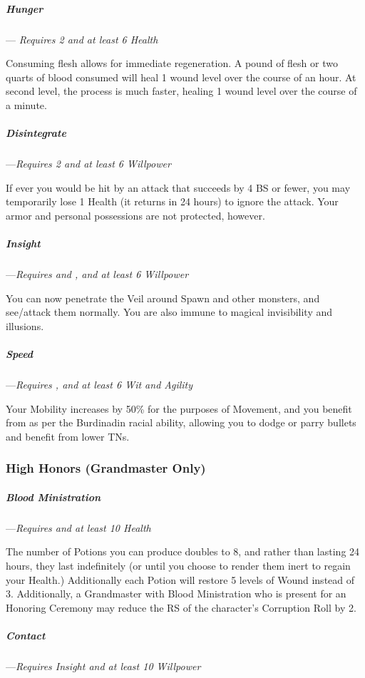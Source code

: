 \documentclass[oneside,11pt,english]{book}
\begin{document}
\subparagraph{Hunger}---\quad\label{honor:Hunger}
\emph{Requires  2 and at least 6 Health}

Consuming flesh allows for immediate regeneration. A pound of flesh or two quarts of blood consumed will heal 1 wound level over the 
course of an hour. At second level, the process is much faster, healing 1 wound level over the 
course of a minute.

\subparagraph{Disintegrate}\label{honor:Disintegrate}
---\quad \emph{Requires  2 and at least 6 Willpower}

If ever you would be hit by an attack that succeeds by 4 BS or fewer, you may temporarily lose 1 Health (it returns in 24 hours) 
to ignore the attack. Your armor and personal possessions are not protected, however. 

\subparagraph{Insight}\label{honor:Insight}
---\quad \emph{Requires  and , and at least 6 Willpower}

You can now penetrate the Veil 
around Spawn and other monsters, and see/attack them normally. You are also immune to 
magical invisibility and illusions. 

\subparagraph{Speed}\label{honor:Speed}
---\quad \emph{Requires , and at least 6 Wit and Agility}

Your Mobility increases by 50\% for the 
purposes of Movement, and you benefit from  as per the Burdinadin racial ability, 
allowing you to dodge or parry bullets and benefit from lower TNs. 

\subsubsection{High Honors (Grandmaster Only)}
\subparagraph{Blood Ministration}\label{honor:Blood Ministration}
---\quad \emph{Requires  and at least 10 Health}

The number of Potions you can produce doubles to 8, and rather than lasting 24 hours, they last indefinitely (or until you 
choose to render them inert to regain your Health.) Additionally each Potion will restore 5 levels of Wound instead of 3.
Additionally, a Grandmaster with Blood Ministration who is present for an 
Honoring Ceremony may reduce the RS of the character’s Corruption Roll by 2. 

\subparagraph{Contact}\label{honor:Contact}
---\quad \emph{Requires Insight and at least 10 Willpower}
\end{document}
